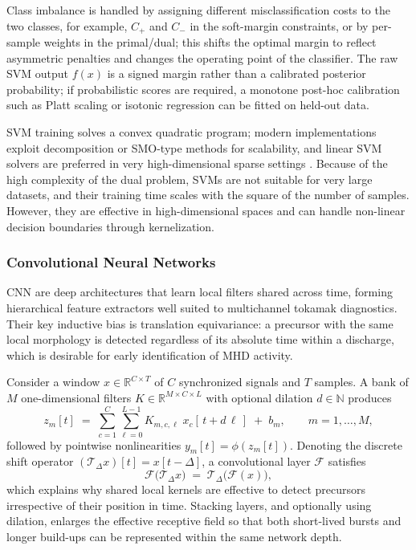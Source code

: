 Class imbalance is handled by assigning different misclassification costs to the two classes, for example, $C_+$ and $C_-$ in the soft-margin constraints, or by per-sample weights in the primal/dual; this shifts the optimal margin to reflect asymmetric penalties and changes the operating point of the classifier. The raw SVM output $f(x)$ is a signed margin rather than a calibrated posterior probability; if probabilistic scores are required, a monotone post-hoc calibration such as Platt scaling or isotonic regression can be fitted on held-out data.

SVM training solves a convex quadratic program; modern implementations exploit decomposition or SMO-type methods for scalability, and linear SVM solvers are preferred in very high-dimensional sparse settings \autocite{cortesSupportvectorNetworks1995b,scholkopfLearningKernelsSupport2001}. Because of the high complexity of the dual problem, \ac{SVM}s are not suitable for very large datasets, and their training time scales with the square of the number of samples. However, they are effective in high-dimensional spaces and can handle non-linear decision boundaries through kernelization.

\subsubsection{Convolutional Neural Networks}\label{sec:cnn}

\ac{CNN} are deep architectures that learn local filters shared across time, forming hierarchical feature extractors well suited to multichannel tokamak diagnostics. Their key inductive bias is translation equivariance: a precursor with the same local morphology is detected regardless of its absolute time within a discharge, which is desirable for early identification of \ac{MHD} activity.

Consider a window $x \in \mathbb{R}^{C \times T}$ of $C$ synchronized signals and $T$ samples. A bank of $M$ one-dimensional filters $K \in \mathbb{R}^{M \times C \times L}$ with optional dilation $d \in \mathbb{N}$ produces
\begin{equation}
z_{m}[t] \;=\; \sum_{c=1}^{C}\sum_{\ell=0}^{L-1} K_{m,c,\ell}\; x_{c}[\,t + d\,\ell\,] \;+\; b_{m},
\qquad m=1,\dots,M,
\label{eq:conv1d}
\end{equation}
followed by pointwise nonlinearities $y_m[t]=\phi(z_m[t])$. Denoting the discrete shift operator $(\mathcal{T}_\Delta x)[t]=x[t-\Delta]$, a convolutional layer $\mathcal{F}$ satisfies
\begin{equation}
\mathcal{F}\!\big(\mathcal{T}_\Delta x\big)\;=\;\mathcal{T}_\Delta\!\big(\mathcal{F}(x)\big),
\label{eq:equivariance}
\end{equation}
which explains why shared local kernels are effective to detect precursors irrespective of their position in time. Stacking layers, and optionally using dilation, enlarges the effective receptive field so that both short-lived bursts and longer build-ups can be represented within the same network depth.

